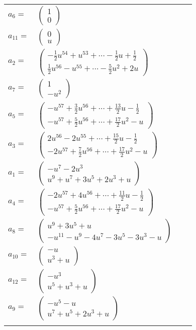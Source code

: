 \documentclass[1p]{elsarticle_modified}
\theoremstyle{definition}
\begin{document}
\begin{tabular}{m{7pt} m{180pt} m{7pt} m{180pt} }
\flushright $a_{6}=$&$\begin{pmatrix}1\\0\end{pmatrix}$ \\
\flushright $a_{11}=$&$\begin{pmatrix}0\\u\end{pmatrix}$ \\
\flushright $a_{2}=$&$\begin{pmatrix}-\frac{1}{2} u^{54}+u^{53}+\cdots-\frac{1}{2} u+\frac{1}{2}\\\frac{1}{2} u^{56}- u^{55}+\cdots-\frac{5}{2} u^2+2 u\end{pmatrix}$ \\
\flushright $a_{7}=$&$\begin{pmatrix}1\\- u^2\end{pmatrix}$ \\
\flushright $a_{5}=$&$\begin{pmatrix}- u^{57}+\frac{3}{2} u^{56}+\cdots+\frac{13}{2} u-\frac{1}{2}\\- u^{57}+\frac{5}{2} u^{56}+\cdots+\frac{17}{2} u^2- u\end{pmatrix}$ \\
\flushright $a_{3}=$&$\begin{pmatrix}2 u^{56}-2 u^{55}+\cdots+\frac{15}{2} u-\frac{1}{2}\\-2 u^{57}+\frac{7}{2} u^{56}+\cdots+\frac{17}{2} u^2- u\end{pmatrix}$ \\
\flushright $a_{1}=$&$\begin{pmatrix}- u^7-2 u^3\\u^9+u^7+3 u^5+2 u^3+u\end{pmatrix}$ \\
\flushright $a_{4}=$&$\begin{pmatrix}-2 u^{57}+4 u^{56}+\cdots+\frac{11}{2} u-\frac{1}{2}\\- u^{57}+\frac{5}{2} u^{56}+\cdots+\frac{17}{2} u^2- u\end{pmatrix}$ \\
\flushright $a_{8}=$&$\begin{pmatrix}u^9+3 u^5+u\\- u^{11}- u^9-4 u^7-3 u^5-3 u^3- u\end{pmatrix}$ \\
\flushright $a_{10}=$&$\begin{pmatrix}- u\\u^3+u\end{pmatrix}$ \\
\flushright $a_{12}=$&$\begin{pmatrix}- u^3\\u^5+u^3+u\end{pmatrix}$ \\
\flushright $a_{9}=$&$\begin{pmatrix}- u^5- u\\u^7+u^5+2 u^3+u\end{pmatrix}$\\&\end{tabular}
\end{document}
